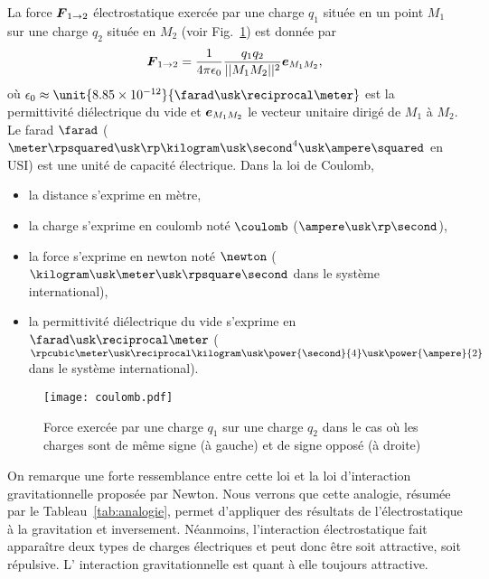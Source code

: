 \begin{defn}
	La force $\vecf_{1 \rightarrow 2}$ électrostatique
	exercée par une charge $q_1$ située en un point $M_1$ sur une 
	charge $q_2$ située en $M_2$ (voir Fig.~\ref{fig:coulomb}) est donnée par
	\begin{equation}
		\label{eq:loi_coulomb}
		\vecf_{1 \rightarrow 2} = \dfrac{1}{4\pi\epsilon_0}
	                                \dfrac{q_1 q_2}{||M_1M_2||^2}
					\mitbf{e}_{M_1M_2},
	\end{equation}
	où $\epsilon_0 \approx \unit{8.85 \times 10^{-12}}
	{\farad \usk \reciprocal \meter}$ 
	est la permittivité diélectrique
	du vide et $\mitbf{e}_{M_1M_2}$ le vecteur unitaire dirigé de $M_1$ à
	$M_2$. Le farad $\farad$ ($\meter \rpsquared \usk \rp \kilogram
	\usk \second^4 \usk \ampere \squared$ en USI)
	est une unité de capacité électrique.
	Dans la loi de Coulomb,
	\begin{itemize}
		\item la distance s'exprime en mètre,
		\item la charge s'exprime en coulomb noté $\coulomb$
		($\ampere \usk \rp \second$),
		\item la force s'exprime en newton noté $\newton$ 
		  ($\kilogram \usk \meter
		  \usk \rpsquare \second$ dans le système international),
		\item la permittivité diélectrique du vide s'exprime en 
		  $\farad \usk \reciprocal \meter$ 
		  ($\rpcubic \meter \usk \reciprocal \kilogram \usk 
		  \power{\second}{4} \usk \power{\ampere}{2}$ dans le système
		  international).
	\end{itemize}

\end{defn}

\begin{figure}[h!]
	\centering
	\texttt{[image: coulomb.pdf]}
	\caption{Force exercée par une charge $q_1$ sur une charge $q_2$ dans
	         le cas où les charges sont de même signe (à gauche) et de 
	 	signe opposé (à droite)}%
	\label{fig:coulomb}
\end{figure}


On remarque une forte ressemblance entre cette loi et la loi d'interaction gravitationnelle
proposée par Newton. Nous verrons que cette analogie, résumée par le Tableau~\ref{tab:analogie},
permet d'appliquer des résultats de l'électrostatique à la gravitation et inversement.
Néanmoins, l'interaction électrostatique fait apparaître deux types de charges
électriques et peut donc être soit attractive, soit répulsive. L'
interaction gravitationnelle est quant à elle toujours attractive.

